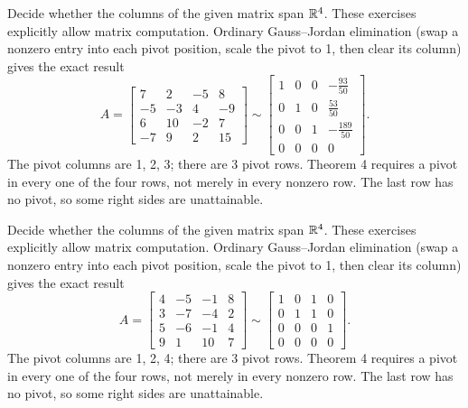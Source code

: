 \goal Decide whether the columns of the given matrix span $\mathbb{R}^4$.
These exercises explicitly allow matrix computation. Ordinary
Gauss--Jordan elimination (swap a nonzero entry into each pivot position,
scale the pivot to 1, then clear its column) gives the exact result
\[A=\left[\begin{matrix}7 & 2 & -5 & 8\\-5 & -3 & 4 & -9\\6 & 10 & -2 & 7\\-7 & 9 & 2 & 15\end{matrix}\right]\sim\left[\begin{matrix}1 & 0 & 0 & - \frac{93}{50}\\0 & 1 & 0 & \frac{53}{50}\\0 & 0 & 1 & - \frac{189}{50}\\0 & 0 & 0 & 0\end{matrix}\right].\]
The pivot columns are 1, 2, 3; there are 3 pivot rows.
Theorem 4 requires a pivot in every one of the four rows, not merely
in every nonzero row. The last row has no pivot, so some
right sides are unattainable.

\goal Decide whether the columns of the given matrix span $\mathbb{R}^4$.
These exercises explicitly allow matrix computation. Ordinary
Gauss--Jordan elimination (swap a nonzero entry into each pivot position,
scale the pivot to 1, then clear its column) gives the exact result
\[A=\left[\begin{matrix}4 & -5 & -1 & 8\\3 & -7 & -4 & 2\\5 & -6 & -1 & 4\\9 & 1 & 10 & 7\end{matrix}\right]\sim\left[\begin{matrix}1 & 0 & 1 & 0\\0 & 1 & 1 & 0\\0 & 0 & 0 & 1\\0 & 0 & 0 & 0\end{matrix}\right].\]
The pivot columns are 1, 2, 4; there are 3 pivot rows.
Theorem 4 requires a pivot in every one of the four rows, not merely
in every nonzero row. The last row has no pivot, so some
right sides are unattainable.

